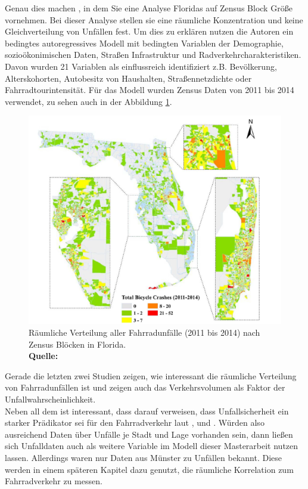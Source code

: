 \documentclass[a4paper,12pt]{thesis}
\newcommand*{\captionsource}[2]{%
	\caption[{#1}]{%
		#1%
		\\\hspace{\linewidth}%
		\textbf{Quelle:} #2%
	}%
}
\begin{document}
Genau dies machen \cite{Saha2018}, in dem Sie eine Analyse Floridas auf Zensus Block Größe vornehmen. Bei dieser Analyse stellen sie eine räumliche Konzentration und keine Gleichverteilung von Unfällen fest. Um dies zu erklären nutzen die Autoren ein bedingtes autoregressives Modell mit bedingten Variablen der Demographie, sozioökonimischen Daten, Straßen Infrastruktur und Radverkehrcharakteristiken. Davon wurden 21 Variablen als einflussreich identifiziert z.B. Bevölkerung, Alterskohorten, Autobesitz von Haushalten, Straßennetzdichte oder Fahrradtourintensität. Für das Modell wurden Zensus Daten von 2011 bis 2014 verwendet, zu sehen auch in der Abbildung \ref{SAHA}.  
\begin{figure}[!ht]
	\centering
	\includegraphics[width=\textwidth]{Plots/saha.png}
	\captionsource{Räumliche Verteilung aller Fahrradunfälle (2011 bis 2014) nach Zensus Blöcken in Florida.}{
		\cite{Saha2018}
	}
	\label{SAHA}
\end{figure}
Gerade die letzten zwei Studien zeigen, wie interessant die räumliche Verteilung von Fahrradunfällen ist und \cite{Kondo2018} zeigen auch das Verkehrsvolumen als Faktor der Unfallwahrscheinlichkeit.\\
Neben all dem ist interessant, dass \cite{Kondo2018} darauf verweisen, dass Unfallsicherheit ein starker Prädikator sei für den Fahrradverkehr laut \cite{Pucher2010}, \cite{Thomas2013} und \cite{Winters2010}. Würden also ausreichend Daten über Unfälle je Stadt und Lage vorhanden sein, dann ließen sich Unfalldaten auch als weitere Variable im Modell dieser Masterarbeit nutzen lassen. Allerdings waren nur Daten aus Münster zu Unfällen bekannt. Diese werden in einem späteren Kapitel dazu genutzt, die räumliche Korrelation zum Fahrradverkehr zu messen.
\end{document}
